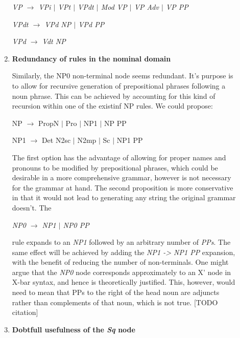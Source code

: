 \documentclass{article}
\begin{document}
\begin{description}
\begin{enumerate}
\begin{center}
			\emph{VP $\rightarrow$ VPi $\vert$ VPt $\vert$ VPdt $\vert$ Mod VP $\vert$ VP Adv $\vert$ VP PP}
			
			\emph{VPdt $\rightarrow$ VPd NP $\vert$ VPd PP}
			
			\emph{VPd $\rightarrow$ Vdt NP}
			
		\end{center}
		
		\item
		\textbf{Redundancy of rules in the nominal domain}
		
		Similarly, the NP0 non-terminal node seems redundant. It's purpose is to allow for recursive generation of prepositional phrases following a noun phrase. This can be achieved by accounting for this kind of recursion within one of the existinf NP rules. We could propose:
		
		\begin{center}
			
			NP $\rightarrow$ PropN $\vert$ Pro $\vert$ NP1 $\vert$ NP PP
			
			NP1 $\rightarrow$ Det N2sc $\vert$ N2mp $\vert$ Sc $\vert$ NP1 PP
			
		\end{center}
		
		The first option has the advantage of allowing for proper names and pronouns to be modified by prepositional phrases, which could be desirable in a more comprehensive grammar, however is not necessary for the grammar at hand. The second proposition is more conservative in that it would not lead to generating any string the original grammar doesn't. The 
		\begin{center}
			
			\emph{NP0 $\rightarrow$ NP1 $\vert$ NP0 PP}
			
		\end{center}
		rule expands to an \emph{NP1} followed by an arbitrary number of \emph{PPs}. The same effect will be achieved by adding the \emph{NP1 -> NP1 PP} expansion, with the benefit of reducing the number of non-terminals.
		One might argue that the \emph{NP0} node corresponds approximately to an X' node in X-bar syntax, and hence is theoretically justified. This, however, would need to mean that PPs to the right of the head noun are adjuncts rather than complements of that noun, which is not true. [TODO citation]
		
		\item
		\textbf{Dobtfull usefulness of the \textit{Sq} node}
		

\end{enumerate}
\end{description}
\end{document}
